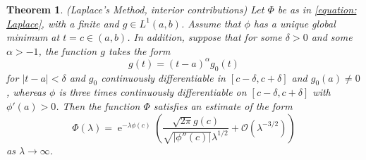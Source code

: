 \documentclass[]{report}
\DeclareMathOperator{\ee}{e}
\newcommand{\Boh}{\mathcal{O}}
\newtheorem{thm}[lemma]{Theorem}
\numberwithin{equation}{section} %
\begin{document}
\begin{thm}
	(Laplace's Method, interior contributions) Let $\Phi$ be as in \ref{equation: Laplace}, with a finite and $g \in L^1(a,b)$. Assume that $\phi$ has a unique global minimum at $t=c \in (a,b)$. In addition, suppose that for some $\delta > 0$ and some $\alpha > -1$, the function $g$ takes the form
	$$ g(t) = (t-a)^{\alpha} g_0(t)$$
	for $|t-a| < \delta$ and $g_0$ continuously differentiable in $[c-\delta, c+\delta]$ and $g_0(a) \neq 0$, whereas $\phi$ is three times continuously differentiable on $[c-\delta, c+\delta]$ with $\phi'(a) > 0$. Then the function $\Phi$ satisfies an estimate of the form
	\begin{equation}
		\Phi(\lambda) = \ee^{-\lambda \phi(c)} \left( \frac{\sqrt{2\pi} g(c)}{\sqrt{|\phi''(c)|}\lambda^{1/2}} + \Boh(\lambda^{-3/2})\right)
	\end{equation}
	as $\lambda \rightarrow \infty$.
	\label{prop: (Laplace's Method, interior contributions)}
\end{thm}
\end{document}
